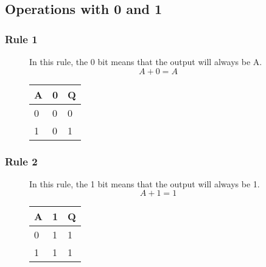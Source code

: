 \subsection*{Operations with 0 and 1}
\subsubsection*{Rule 1}
\begin{figure}[H]
    \begin{minipage}[t]{0.65\textwidth}
        In this rule, the 0 bit means that the output will always be A.
        \[A + 0 = A\]
    \end{minipage}\hfill
    \begin{minipage}[t]{0.25\textwidth}
        \begin{table}[H]
            \begin{tabularx}{0.5\textwidth}{XX|X}
                A & 0 & Q\\
                \hline
                0 & 0 & 0\\
                1 & 0 & 1\\
            \end{tabularx}
        \end{table}
    \end{minipage}\hfill
\end{figure}

\subsubsection*{Rule 2}
\begin{figure}[H]
    \begin{minipage}[t]{0.65\textwidth}
        In this rule, the 1 bit means that the output will always be 1.
        \[A + 1 = 1\]
    \end{minipage}\hfill
    \begin{minipage}[t]{0.25\textwidth}
        \begin{table}[H]
            \begin{tabularx}{0.5\textwidth}{XX|X}
                A & 1 & Q\\
                \hline
                0 & 1 & 1\\
                1 & 1 & 1\\
            \end{tabularx}
        \end{table}
    \end{minipage}\hfill
\end{figure}

